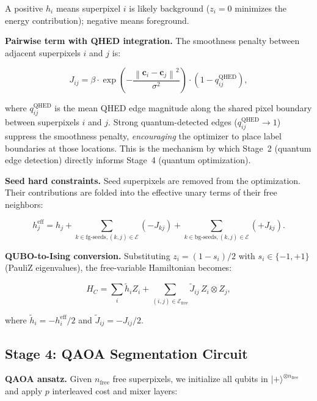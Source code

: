 \documentclass[journal]{IEEEtran}
\newcommand{\qket}[1]{|#1\rangle}
\newcommand{\norm}[1]{\left\|#1\right\|}
\begin{document}
A positive $h_i$ means superpixel $i$ is likely background ($z_i = 0$
minimizes the energy contribution); negative means foreground.

\textbf{Pairwise term with QHED integration.}
The smoothness penalty between adjacent superpixels $i$ and $j$ is:

\begin{equation}
  J_{ij} = \beta \cdot \exp\!\left(-\frac{\norm{\mathbf{c}_i - \mathbf{c}_j}^2}{\sigma^2}\right)
           \cdot (1 - q^{\text{QHED}}_{ij}),
  \label{eq:pairwise}
\end{equation}

where $q^{\text{QHED}}_{ij}$ is the mean QHED edge magnitude along the
shared pixel boundary between superpixels $i$ and $j$.  Strong quantum-detected
edges ($q^{\text{QHED}}_{ij} \to 1$) suppress the smoothness penalty,
\emph{encouraging} the optimizer to place label boundaries at those locations.
This is the mechanism by which Stage~2 (quantum edge detection) directly
informs Stage~4 (quantum optimization).

\textbf{Seed hard constraints.}
Seed superpixels are removed from the optimization.  Their contributions
are folded into the effective unary terms of their free neighbors:

\begin{equation}
  h_j^{\text{eff}} = h_j
    + \sum_{k \in \text{fg-seeds}, (k,j)\in\mathcal{E}} (-J_{kj})
    + \sum_{k \in \text{bg-seeds}, (k,j)\in\mathcal{E}} (+J_{kj}).
  \label{eq:constraints}
\end{equation}

\textbf{QUBO-to-Ising conversion.}
Substituting $z_i = (1 - s_i)/2$ with $s_i \in \{-1, +1\}$ (PauliZ
eigenvalues), the free-variable Hamiltonian becomes:

\begin{equation}
  H_C = \sum_{i} \tilde{h}_i Z_i
       + \sum_{(i,j)\in\mathcal{E}_{\text{free}}} \tilde{J}_{ij}\, Z_i \otimes Z_j,
  \label{eq:ising}
\end{equation}

where $\tilde{h}_i = -h_i^{\text{eff}}/2$ and
$\tilde{J}_{ij} = -J_{ij}/2$.

\subsection{Stage 4: QAOA Segmentation Circuit}

\textbf{QAOA ansatz.}
Given $n_{\text{free}}$ free superpixels, we initialize all qubits in
$\qket{+}^{\otimes n_{\text{free}}}$ and apply $p$ interleaved cost and
mixer layers:
\end{document}
